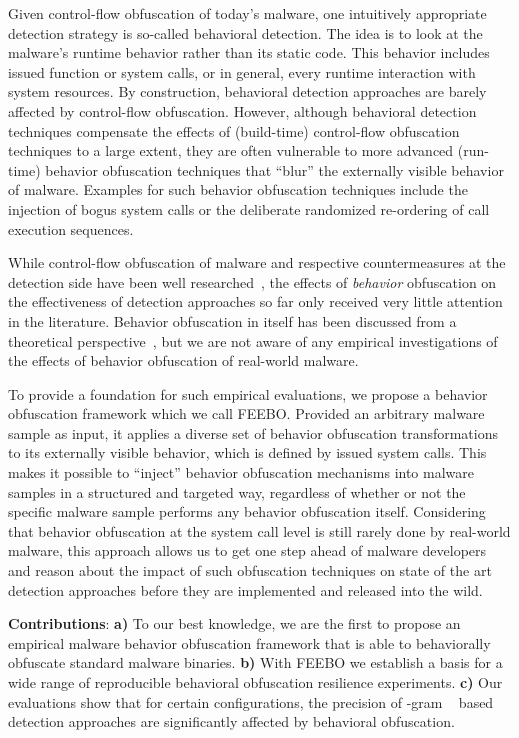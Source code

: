 \documentclass{llncs}
\begin{document}
Given control-flow obfuscation of today's malware, one intuitively appropriate detection strategy is so-called behavioral detection. The idea is to look at the malware's runtime behavior rather than its static code. This behavior includes issued function or system calls, or in general, every runtime interaction with system resources. By construction, behavioral detection approaches are barely affected by control-flow obfuscation. However, although behavioral detection techniques compensate the effects of (build-time) control-flow obfuscation techniques to a large extent, they are often vulnerable to more advanced (run-time) behavior obfuscation techniques that ``blur'' the externally visible behavior of malware. Examples for such behavior obfuscation techniques include the injection of bogus system calls or the deliberate randomized re-ordering of call execution sequences.

While control-flow obfuscation of malware and respective 
countermeasures at the detection side have been well 
researched~\cite{Collberg2009}, the effects of 
\emph{behavior} obfuscation on the effectiveness of detection approaches so 
far only received very little attention in the literature. Behavior obfuscation 
in itself has been discussed from a theoretical 
perspective~\cite{dalla2008semantics}, but we are not aware of any empirical investigations of the effects of behavior obfuscation of real-world malware.

To provide a foundation for such empirical evaluations, we propose a behavior obfuscation framework which we call FEEBO. Provided an arbitrary malware sample as input, it applies a diverse set of behavior obfuscation transformations to its externally visible behavior, which is defined by issued system calls. This makes it possible to ``inject'' behavior obfuscation mechanisms into malware samples in a structured and targeted way, regardless of whether or not the specific malware sample performs any behavior obfuscation itself. Considering that behavior obfuscation at the system call level is still rarely done by real-world malware, this approach allows us to get one step ahead of malware developers and reason about the impact of such obfuscation techniques on state of the art detection approaches before they are implemented and released into the wild. 

\textbf{Contributions}: \textbf{a)} To our best knowledge, we are the first to propose an empirical malware behavior obfuscation framework that is able to behaviorally obfuscate standard malware binaries. \textbf{b)} With FEEBO we establish a basis for a wide range of reproducible behavioral obfuscation resilience experiments. \textbf{c)} Our evaluations show that for certain configurations, the precision of -gram ~\cite{wressnegger2013} based detection approaches are significantly affected by behavioral obfuscation.
\end{document}
